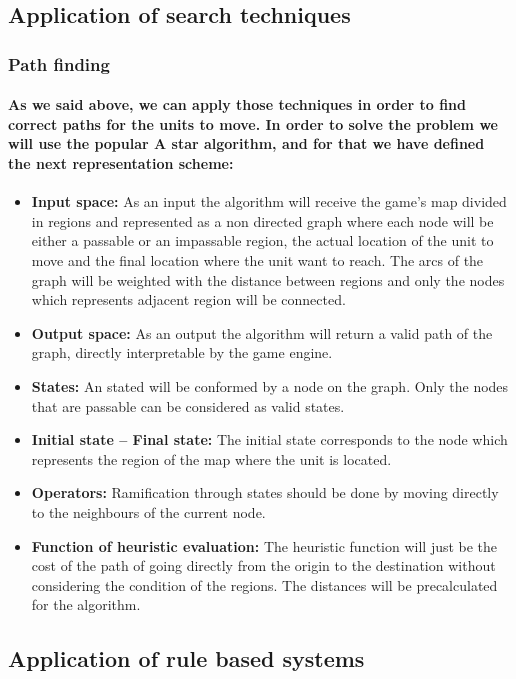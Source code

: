 \documentclass[a4paper,10pt]{article}
\newcommand{\p}[1]{\paragraph{\indent\textnormal{#1}}}
\begin{document}
  \subsection{Application of search techniques}

    \subsubsection{Path finding}
    \p{As we said above, we can apply those techniques in order to find correct paths for the units to move. In order to solve the problem we will use the popular A star algorithm, and for that we have defined the next representation scheme:}

    \begin{itemize}
     \item \textbf{Input space:} As an input the algorithm will receive the game's map divided in regions and represented as a non directed graph where each node will be either a passable or an impassable region, the actual location of the unit to move and the final location where the unit want to reach. The arcs of the graph will be weighted with the distance between regions and only the nodes which represents adjacent region will be connected.
     \item \textbf{Output space:} As an output the algorithm will return a valid path of the graph, directly interpretable by the game engine.
     \item \textbf{States:} An stated will be conformed by a node on the graph. Only the nodes that are passable can be considered as valid states. 
     \item \textbf{Initial state – Final state:} The initial state corresponds to the node which represents the region of the map where the unit is located.
     \item \textbf{Operators:} Ramification through states should be done by moving directly to the neighbours of the current node.
     \item \textbf{Function of heuristic evaluation:} The heuristic function will just be the cost of the path of going directly from the origin to the destination without considering the condition of the regions. The distances will be precalculated for the algorithm.
    \end{itemize}

  \subsection{Application of rule based systems}
  
\end{document}
